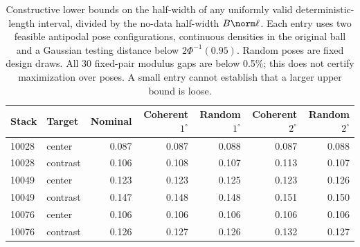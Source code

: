 \begin{table}[t]
\centering
\begin{tabular}{llrrrrr}
\toprule
Stack & Target & Nominal & Coherent $1^\circ$ & Random $1^\circ$ & Coherent $2^\circ$ & Random $2^\circ$ \\
\midrule
10028 & center & 0.087 & 0.087 & 0.088 & 0.087 & 0.088 \\
10028 & contrast & 0.106 & 0.108 & 0.107 & 0.113 & 0.107 \\
10049 & center & 0.123 & 0.123 & 0.125 & 0.123 & 0.126 \\
10049 & contrast & 0.147 & 0.148 & 0.148 & 0.151 & 0.150 \\
10076 & center & 0.106 & 0.106 & 0.106 & 0.106 & 0.106 \\
10076 & contrast & 0.126 & 0.127 & 0.126 & 0.132 & 0.127 \\
\bottomrule
\end{tabular}
\caption{Constructive lower bounds on the half-width of any uniformly valid deterministic-length interval, divided by the no-data half-width $B\norm\ell$. Each entry uses two feasible antipodal pose configurations, continuous densities in the original ball and a Gaussian testing distance below $2\Phi^{-1}(0.95)$. Random poses are fixed design draws. All 30 fixed-pair modulus gaps are below 0.5\%; this does not certify maximization over poses. A small entry cannot establish that a larger upper bound is loose.}
\label{tab:two-pose-modulus}
\end{table}
